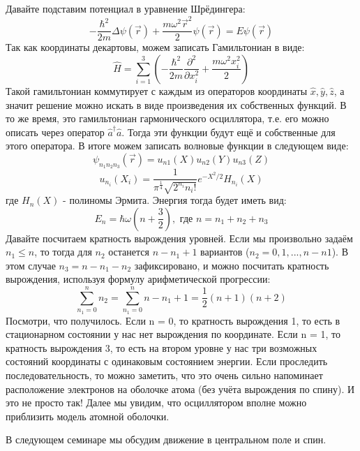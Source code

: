 Давайте подставим потенциал в уравнение Шрёдингера:
\[
-\frac{\hbar^2}{2m}\Delta\psi(\vec{r}) + \frac{m\omega^2\vec{r}^2}{2}\psi(\vec{r}) = E\psi(\vec{r})
\]
Так как координаты декартовы, можем записать Гамильтониан в виде:
\[
\hat H = \sum\limits_{i=1}^3(-\frac{\hbar^2}{2m}\frac{\partial^2}{\partial x_i^2} + \frac{m\omega^2x_i^2}{2})
\]
Такой гамильтониан коммутирует с каждым из операторов координаты $\hat{x}, \hat{y}, \hat{z}$, а значит решение можно искать в виде произведения их собственных функций. В то же время, это гамильтониан гармонического осциллятора, т.е. его можно описать через оператор $\hat{a}^{\dagger}\hat{a}$. Тогда эти функции будут ещё и собственные для этого оператора. В итоге можем записать волновые функции в следующем виде:
\[
\psi_{n_1n_2n_3}(\vec{r}) = u_{n1}(X)u_{n2}(Y)u_{n3}(Z)
\]
\[
u_{n_i}(X_i) = \frac{1}{\pi^{\frac{1}{4}}\sqrt{2^{n_i}n_i!}}e^{-X^2/2}H_{n_i}(X)
\]
где $H_{n}(X)$ - полиномы Эрмита. Энергия тогда будет иметь вид:
\[
E_n = \hbar\omega(n+\frac{3}{2}), \text{ где } n = n_1 + n_2 + n_3
\]
Давайте посчитаем кратность вырождения уровней. Если мы произвольно задаём $n_1 \leq n$, то тогда для $n_2$ останется $n-n_1+1$ вариантов ($n_2 = 0, 1, ... ,n - n1$). В этом случае $n_3 = n - n_1 - n_2$ зафиксировано, и можно посчитать кратность вырождения, используя формулу арифметической прогрессии: 
\[
\sum\limits_{n_1 = 0}^n n_2 = \sum\limits_{n_1 = 0}^n n-n_1 + 1 = \frac{1}{2}(n+1)(n+2)
\]
Посмотри, что получилось. Если n = 0, то кратность вырождения 1, то есть в стационарном состоянии у нас нет вырождения по координате. Если n = 1, то кратность вырождения 3, то есть на втором уровне у нас три возможных состояний координаты с одинаковым состоянием энергии. Если проследить последовательность, то можно заметить, что это очень сильно напоминает расположение электронов на оболочке атома (без учёта вырождения по спину). И это не просто так! Далее мы увидим, что осциллятором вполне можно приблизить модель атомной оболочки.

В следующем семинаре мы обсудим движение в центральном поле и спин.

